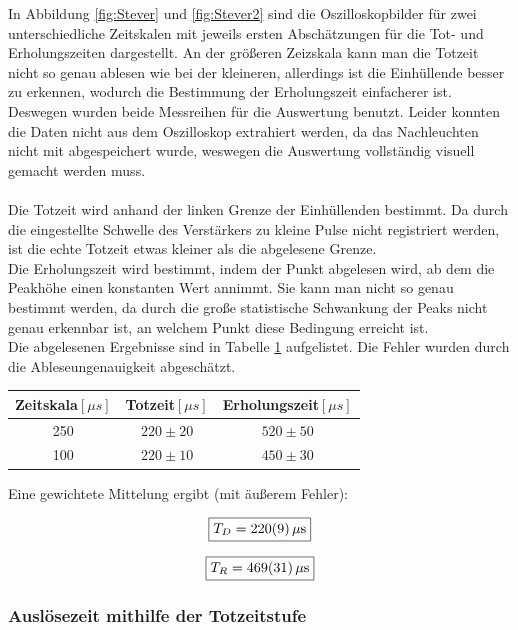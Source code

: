 \documentclass[12pt,a4paper]{article}
\begin{document}
In Abbildung \ref{fig:Stever} und \ref{fig:Stever2} sind die Oszilloskopbilder für zwei unterschiedliche Zeitskalen mit jeweils ersten Abschätzungen für die Tot- und Erholungszeiten dargestellt. An der größeren Zeizskala kann man die Totzeit nicht so genau ablesen wie bei der kleineren, allerdings ist die Einhüllende besser zu erkennen, wodurch die Bestimmung der Erholungszeit einfacherer ist. Deswegen wurden beide Messreihen für die Auswertung benutzt.
Leider konnten die Daten nicht aus dem Oszilloskop extrahiert werden, da das Nachleuchten nicht mit abgespeichert wurde, weswegen die Auswertung vollständig visuell gemacht werden muss.\\
\\
Die Totzeit wird anhand der linken Grenze der Einhüllenden bestimmt. Da durch die eingestellte Schwelle des Verstärkers zu kleine Pulse nicht registriert werden, ist die echte Totzeit etwas kleiner als die abgelesene Grenze.\\
Die Erholungszeit wird bestimmt, indem der Punkt abgelesen wird, ab dem die Peakhöhe einen konstanten Wert annimmt.
Sie kann man nicht so genau bestimmt werden, da durch die große statistische Schwankung der Peaks nicht genau erkennbar ist, an welchem Punkt diese Bedingung erreicht ist.\\
Die abgelesenen Ergebnisse sind in Tabelle \ref{teb:Stever} aufgelistet. Die Fehler wurden durch die Ableseungenauigkeit abgeschätzt.

\begin{table}
\centering
\begin{tabular}{|c|c|c|}
\hline
Zeitskala$[\mu s]$ & Totzeit$[\mu s]$ & Erholungszeit$[\mu s]$\\
\hline 
250 & $220\pm 20$ & $520\pm 50$ \\
\hline 
100 & $220\pm 10$ & $450\pm 30$ \\
\hline
\end{tabular}
\label{teb:Stever}
\end{table}

Eine gewichtete Mittelung ergibt (mit äußerem Fehler):

\begin{equation}
\boxed{T_D = \SI{220 \pm 9}{\mu s}}
\end{equation}

\begin{equation}
\boxed{T_R = \SI{469 \pm 31}{\mu s}}
\end{equation}

\subsubsection{Auslösezeit mithilfe der Totzeitstufe}
\end{document}
